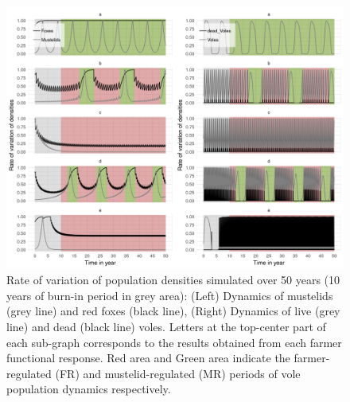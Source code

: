 \documentclass[11pt]{article}
\begin{document}
\begin{figure}
	\begin{center}
		\includegraphics[width=\linewidth]{img/plot_join.png}
		\caption{Rate of variation of population densities simulated over 50 years (10 years of burn-in period in grey area): (Left) Dynamics of mustelids (grey line) and red foxes (black line), (Right) Dynamics of live (grey line) and dead (black line) voles. Letters at the top-center part of each sub-graph corresponds to the results obtained from each farmer functional response. Red area and Green area indicate the farmer-regulated (FR) and mustelid-regulated (MR) periods of vole population dynamics respectively.}
		\label{fig:populations}
	\end{center}
\end{figure}


\end{document}
